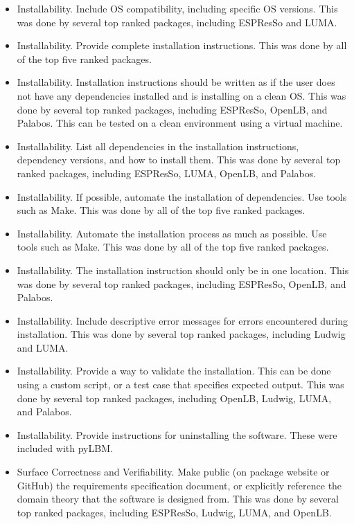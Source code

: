 \documentclass[final, 3p, times, authoryear]{elsarticle}
\begin{document}
\begin{itemize}
	\item Installability. Include OS compatibility, including specific OS
	versions. This was done by several top ranked packages, including ESPResSo
	and LUMA.
	\item Installability. Provide complete installation instructions. This was
	done by all of the top five ranked packages.
	\item Installability. Installation instructions should be written as if the
	user does not have any dependencies installed and is installing on a clean
	OS. This was done by several top ranked packages, including ESPResSo,
	OpenLB, and Palabos. This can be tested on a clean environment using a
	virtual machine.
	\item Installability. List all dependencies in the installation
	instructions, dependency versions, and how to install them. This was done by
	several top ranked packages, including ESPResSo, LUMA, OpenLB, and Palabos.
	\item Installability. If possible, automate the installation of
	dependencies. Use tools such as Make. This was done by all of the top five
	ranked packages.
	\item Installability. Automate the installation process as much as possible.
	Use tools such as Make. This was done by all of the top five ranked
	packages.
	\item Installability. The installation instruction should only be in one
	location. This was done by several top ranked packages, including ESPResSo,
	OpenLB, and Palabos.
	\item Installability. Include descriptive error messages for errors
	encountered during installation. This was done by several top ranked
	packages, including Ludwig and LUMA.
	\item Installability. Provide a way to validate the installation. This can
	be done using a custom script, or a test case that specifies expected
	output. This was done by several top ranked packages, including OpenLB,
	Ludwig, LUMA, and Palabos.
	\item Installability. Provide instructions for uninstalling the software.
	These were included with pyLBM.
	\item Surface Correctness and Verifiability. Make public (on package website
	or GitHub) the requirements specification document, or explicitly reference
	the domain theory that the software is designed from.  This was done by
	several top ranked packages, including ESPResSo, Ludwig, LUMA, and OpenLB.

\end{itemize}
\end{document}
